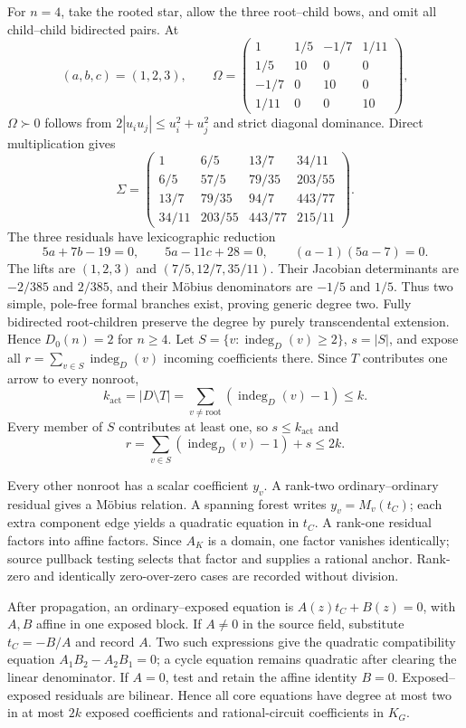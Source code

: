For \(n=4\), take the rooted star, allow the three root--child bows, and omit all child--child bidirected pairs. At
\[
(a,b,c)=(1,2,3),\qquad
\Omega=\begin{pmatrix}
1&1/5&-1/7&1/11\\
1/5&10&0&0\\
-1/7&0&10&0\\
1/11&0&0&10
\end{pmatrix},
\]
\(\Omega\succ0\) follows from \(2|u_iu_j|\le u_i^2+u_j^2\) and strict diagonal dominance. Direct multiplication gives
\[
\Sigma=\begin{pmatrix}
1&6/5&13/7&34/11\\
6/5&57/5&79/35&203/55\\
13/7&79/35&94/7&443/77\\
34/11&203/55&443/77&215/11
\end{pmatrix}.
\]
The three residuals have lexicographic reduction
\[
5a+7b-19=0,\qquad5a-11c+28=0,\qquad(a-1)(5a-7)=0.
\]
The lifts are \((1,2,3)\) and \((7/5,12/7,35/11)\). Their Jacobian determinants are \(-2/385\) and \(2/385\), and their Möbius denominators are \(-1/5\) and \(1/5\). Thus two simple, pole-free formal branches exist, proving generic degree two. Fully bidirected root-children preserve the degree by purely transcendental extension. Hence \(D_0(n)=2\) for \(n\ge4\).
Let \(S=\{v:\operatorname{indeg}_D(v)\ge2\}\), \(s=|S|\), and expose all \(r=\sum_{v\in S}\operatorname{indeg}_D(v)\) incoming coefficients there. Since \(T\) contributes one arrow to every nonroot,
\[
k_{\mathrm{act}}=|D\setminus T|
=\sum_{v\ne\mathrm{root}}(\operatorname{indeg}_D(v)-1)\le k.
\]
Every member of \(S\) contributes at least one, so \(s\le k_{\mathrm{act}}\) and
\[
r=\sum_{v\in S}(\operatorname{indeg}_D(v)-1)+s\le2k.
\]

Every other nonroot has a scalar coefficient \(y_v\). A rank-two ordinary--ordinary residual gives a Möbius relation. A spanning forest writes \(y_v=M_v(t_C)\); each extra component edge yields a quadratic equation in \(t_C\). A rank-one residual factors into affine factors. Since \(A_K\) is a domain, one factor vanishes identically; source pullback testing selects that factor and supplies a rational anchor. Rank-zero and identically zero-over-zero cases are recorded without division.

After propagation, an ordinary--exposed equation is \(A(z)t_C+B(z)=0\), with \(A,B\) affine in one exposed block. If \(A\ne0\) in the source field, substitute \(t_C=-B/A\) and record \(A\). Two such expressions give the quadratic compatibility equation \(A_1B_2-A_2B_1=0\); a cycle equation remains quadratic after clearing the linear denominator. If \(A=0\), test and retain the affine identity \(B=0\). Exposed--exposed residuals are bilinear. Hence all core equations have degree at most two in at most \(2k\) exposed coefficients and rational-circuit coefficients in \(K_G\).

